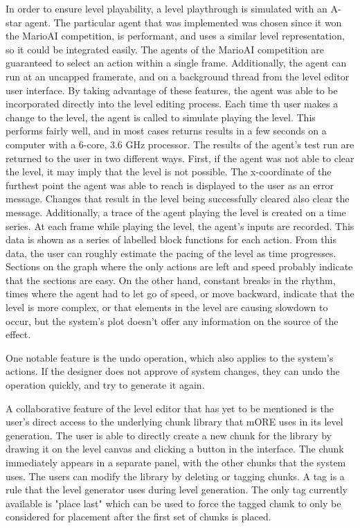 In order to ensure level playability, a level playthrough is simulated with an A-star agent.
The particular agent that was implemented was chosen since it won the MarioAI competition,
is performant, and uses a similar level representation, so it could be integrated easily.
The agents of the MarioAI competition are guaranteed to select an action within a single 
frame. Additionally, the agent can run at an uncapped framerate, and on a background thread
from the level editor user interface. By taking advantage of these features, the agent was
able to be incorporated directly into the level editing process. Each time th user makes
a change to the level, the agent is called to simulate playing the level. This performs fairly
well, and in most cases returns results in a few seconds on a computer with a 6-core, 3.6 GHz
processor. The results of the agent's test run are returned to the user in two different
ways. First, if the agent was not able to clear the level, it may imply that the level is
not possible. The x-coordinate of the furthest point the agent was able to reach is displayed
to the user as an error message. Changes that result in the level being successfully cleared
also clear the message. Additionally, a trace of the agent playing the level is created on a
time series. At each frame while playing the level, the agent's inputs are recorded. This
data is shown as a series of labelled block functions for each action. From this data, the
user can roughly estimate the pacing of the level as time progresses. Sections on the graph
where the only actions are left and speed probably indicate that the sections are easy. On
the other hand, constant breaks in the rhythm, times where the agent had to let go of speed,
or move backward, indicate that the level is more complex, or that elements in the level are
causing slowdown to occur, but the system's plot doesn't offer any information on the source
of the effect.

One notable feature is the undo operation, which also applies to the system's actions. If
the designer does not approve of system changes, they can undo the operation quickly, and try
to generate it again.

A collaborative feature of the level editor that has yet to be mentioned is the user's direct
access to the underlying chunk library that mORE uses in its level generation. The user is 
able to directly create a new chunk for the library by drawing it on the level canvas and
clicking a button in the interface. The chunk immediately appears in a separate panel, with
the other chunks that the system uses. The users can modify the library by deleting or tagging
chunks. A tag is a rule that the level generator uses during level generation. The only tag
currently available is "place last" which can be used to force the tagged chunk to only
be considered for placement after the first set of chunks is placed.


